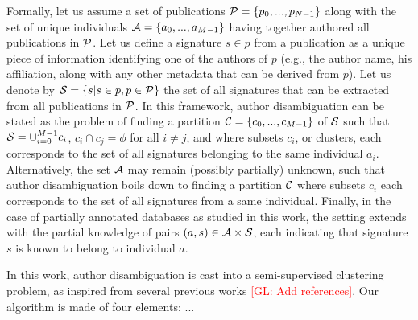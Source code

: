 \documentclass{article}
\newcommand{\glnote}[1]{\textcolor{red}{[GL: #1]}}
\begin{document}
Formally, let us assume a set of publications ${\cal P} = \{ p_0, ...,
p_{N-1}\}$ along with the set of unique individuals ${\cal A} = \{ a_0, ...,
a_{M-1}\}$ having together authored all publications in ${\cal P}$.  Let us
define a signature $s \in p$ from a publication as a unique piece of
information identifying one of the authors of $p$ (e.g., the author name, his
affiliation, along with any other metadata that can be derived from $p$). Let us
denote by ${\cal S} = \{ s | s \in p, p \in {\cal P} \}$ the set of all
signatures that can be extracted from all publications in ${\cal P}$. In this
framework, author disambiguation can be stated as the problem of
finding a partition ${\cal C} = \{ c_0, ..., c_{M-1} \}$ of ${\cal S}$ such
that ${\cal S} = \cup_{i=0}^{M-1} c_i$, $c_i \cap c_j = \phi$ for all $i \neq
j$, and where subsets $c_i$, or clusters, each corresponds to the set of all
signatures belonging to the same individual $a_i$. Alternatively, the set
${\cal A}$ may remain (possibly partially) unknown, such that author
disambiguation boils down to finding a partition ${\cal C}$ where
subsets $c_i$  each corresponds to the set of all signatures from a same
individual. Finally, in the case of partially annotated databases as studied in
this work, the setting extends with the partial knowledge of pairs $(a, s) \in
{\cal A} \times {\cal S}$, each indicating that signature $s$ is known to
belong to individual $a$.

In this work, author disambiguation is cast into a semi-supervised clustering
problem, as inspired from several previous works \glnote{Add references}.
Our algorithm is made of four elements: ...

\end{document}
